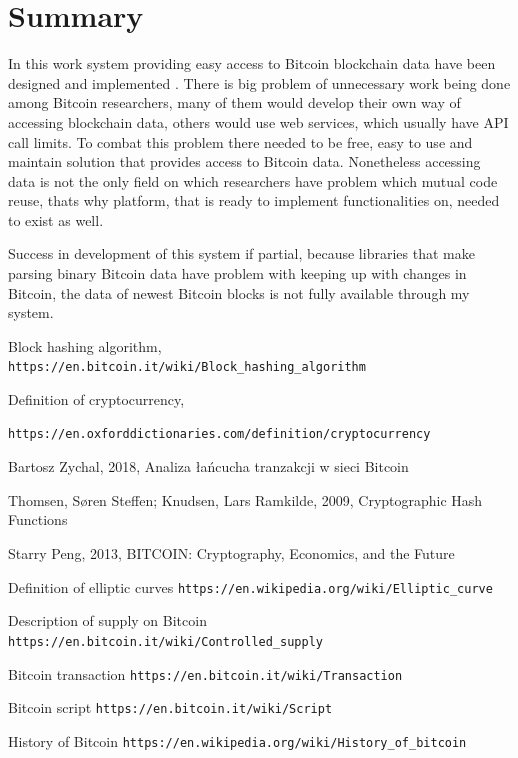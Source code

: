 \documentclass[12pt, en, eng, oneside]{mgr}
\begin{document}
\chapter{Summary}
In this work system providing easy access to Bitcoin blockchain data have been designed and implemented . There is big problem of unnecessary work being done among Bitcoin researchers, many of them would develop their own way of accessing blockchain data, others would use web services, which usually have API call limits. To combat this problem there needed to be free, easy to use and maintain solution that provides access to Bitcoin data. 
Nonetheless accessing data is not the only field on which researchers have problem which mutual code reuse, thats why platform, that is ready to implement functionalities on, needed to exist as well. 

Success in development of this system if partial, because libraries that make parsing binary Bitcoin data have problem with keeping up with changes in Bitcoin, the data of newest Bitcoin blocks is not fully available through my system.    
   

\begin{thebibliography}{9}
 
Block hashing algorithm,
\texttt{https://en.bitcoin.it/wiki/Block\_hashing\_algorithm}

Definition of cryptocurrency,
\begin{verbatim}
https://en.oxforddictionaries.com/definition/cryptocurrency
\end{verbatim}

Bartosz Zychal, 2018, Analiza \l{}a\'ncucha tranzakcji w sieci Bitcoin

Thomsen, Søren Steffen; Knudsen, Lars Ramkilde, 2009, Cryptographic Hash Functions

Starry Peng, 2013, BITCOIN: Cryptography, Economics, and the Future

Definition of elliptic curves
\texttt{https://en.wikipedia.org/wiki/Elliptic\_curve}

Description of supply on Bitcoin
\texttt{https://en.bitcoin.it/wiki/Controlled\_supply}

Bitcoin transaction
\texttt{https://en.bitcoin.it/wiki/Transaction}

Bitcoin script
\texttt{https://en.bitcoin.it/wiki/Script}

History of Bitcoin
\texttt{https://en.wikipedia.org/wiki/History\_of\_bitcoin}

\end{thebibliography}
\end{document}
